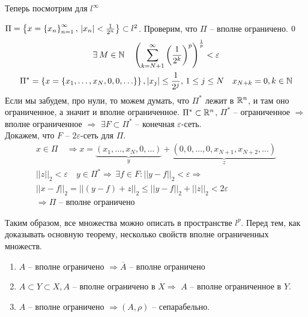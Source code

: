 \documentclass[document]{subfiles}
\begin{document}
Теперь посмотрим для $l^\infty$
\begin{example}
    $ \Pi = \left\{x = \left\{x_n\right\}^\infty_{n=1}, \, |x_n| < \frac{1}{2^n}\right\} \subset l^2$.
    Проверим, что $\Pi$ -- вполне ограничено.
    $\let \varepsilon > 0 $
    \begin{gather*}
        \exists M \in \bN \quad \left( \sum^\infty_{k=N+1} \left( \frac{1}{2^k} \right)^p \right)^{\frac{1}{p}} < \varepsilon \\
        \Pi^* = \seq{x = \seq{x_1, \ldots, x_N, 0, 0, \ldots}}, |x_j| \leq \frac{1}{2^j}, \, 1 \leq j \leq N \quad x_{N+k} =0, k \in \bN
    \end{gather*}
    Если мы забудем, про нули, то можем думать, что $\Pi^*$ лежит в $\mathbb{R}^n$, и там оно ограниченное, а значит и вполне ограниченное.
    $\Pi^* \subset \mathbb{R}^n$, $\Pi^*$ -- ограниченное $\Rightarrow$ вполне ограниченное $\Rightarrow$ 
    $\exists F \subset \Pi^*$ -- конечная $\varepsilon$-сеть. \\
    Докажем, что $F$ -- $2\varepsilon$-сеть для $\Pi$.
    \begin{gather*}
        x \in \Pi \quad \Rightarrow x = \underbrace{(x_1, \ldots, x_N, 0, \ldots)}_y + \underbrace{(0, 0, \ldots, 0, x_{N+1}, x_{N+2}, \ldots)}_z \\
        ||z||_2 < \varepsilon \quad y \in \Pi^* \Rightarrow \, \exists f \in F : ||y - f||_2 < \varepsilon \Rightarrow \\
        ||x - f||_2 = ||(y-f)+z||_2 \leq ||y-f||_2 + ||z||_2 < 2 \varepsilon \\
        \Rightarrow \Pi \text{ -- вполне ограничено }
    \end{gather*}
\end{example}

Таким образом, все множества можно описать в пространстве $l^p$.
Перед тем, как доказывать основную теорему, несколько свойств вполне ограниченных множеств.

\begin{property}
    \begin{enumerate}
        \item $A$ -- вполне ограничено $\Rightarrow \overline{A}$ -- вполне ограничено 
        \item $A \subset Y \subset X, A$  -- вполне ограничено в $X \Rightarrow$  $A$ -- вполне ограниченное в $Y$.
        \item $A$ -- вполне ограничено $\Rightarrow (A, \rho)$ -- сепарабельно.
    \end{enumerate}
\end{property}
\end{document}
